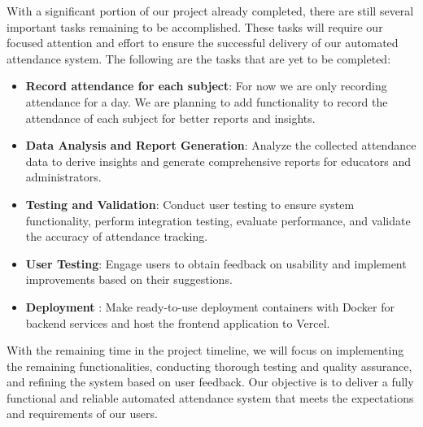With a significant portion of our project already completed, there are still several important tasks remaining to be accomplished. These tasks will require our focused attention and effort to ensure the successful delivery of our automated attendance system. The following are the tasks that are yet to be completed:

\begin{itemize}
\item \textbf {Record attendance for each subject}: For now we are only recording attendance for a day. We are planning to add functionality to record the attendance of each subject for better reports and insights.

\item \textbf { Data Analysis and Report Generation}: Analyze the collected attendance data to derive insights and generate comprehensive reports for educators and administrators.

\item \textbf{ Testing and Validation}: Conduct user testing to ensure system functionality, perform integration testing, evaluate performance, and validate the accuracy of attendance tracking.

\item \textbf{ User Testing}: Engage users to obtain feedback on usability and implement improvements based on their suggestions.

\item \textbf{ Deployment }: Make ready-to-use deployment containers with Docker for backend services and host the frontend application to Vercel.  

\end{itemize}

With the remaining time in the project timeline, we will focus on implementing the remaining functionalities, conducting thorough testing and quality assurance, and refining the system based on user feedback. Our objective is to deliver a fully functional and reliable automated attendance system that meets the expectations and requirements of our users.

